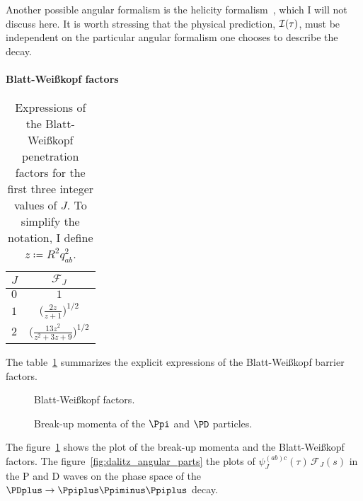     Another possible angular formalism is the helicity formalism~\cite{jacob1959404}, which I will not discuss here.
    It is worth stressing that the physical prediction, $\mathcal{I}(\tau)$, must be independent on the particular angular formalism one chooses to describe the decay.


    \paragraph{Blatt-Wei\ss{}kopf factors}

    \begin{table}
        \centering
        \caption{Expressions of the Blatt-Wei\ss{}kopf penetration factors for the first three integer values of $J$. To simplify the notation, I define $z\coloneqq R^2 q_{ab}^2$.}
        \label{table:blatt_weisskopf}
        \begin{tabular}{lc}
            \toprule
            $J$ &$\mathcal{F}_{\!J}$\\
            \midrule
            $0$ &$1$ \\
            $1$ &$\bigg(\displaystyle\frac{2z}{z + 1}\bigg)^{1/2}$ \\
            $2$ &$\bigg(\displaystyle\frac{13 z^2 }{z^2 + 3z + 9}\bigg)^{1/2}$ \\
            \bottomrule
        \end{tabular}
    \end{table}
    The table~\ref{table:blatt_weisskopf} summarizes the explicit expressions of the Blatt-Wei\ss{}kopf barrier factors.
    \begin{figure}
        \centering
        \subfloat[][P wave.]{}

        \subfloat[][D wave.]{}

        \caption{Blatt-Wei\ss{}kopf factors.}
        \label{fig:blatt_weisskopf}
    \end{figure}
    \begin{figure}
        \centering
        
        \caption{Break-up momenta of the $\Ppi$ and $\PD$ particles.}
    \end{figure}
    The figure~\ref{fig:blatt_weisskopf} shows the plot of the break-up momenta and the Blatt-Wei\ss{}kopf factors.
    The figure~\ref{fig:dalitz_angular_parts} the plots of $\psi_J^{(ab)c}(\tau)\,\mathcal{F}_J(s)$ in the P and D waves on the phase space of the $\PDplus\to\Ppiplus\Ppiminus\Ppiplus$ decay.

